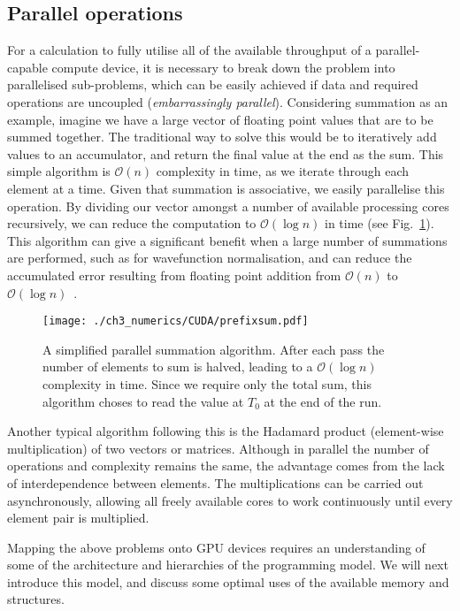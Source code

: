 \subsection{Parallel operations}\label{subsec:par_op}
\label{sub:Parallel operations}
For a calculation to fully utilise all of the available throughput of a parallel-capable compute device, it is necessary to break down the problem into parallelised sub-problems, which can be easily achieved if data and required operations are uncoupled (\textit{embarrassingly parallel}). Considering summation as an example, imagine we have a large vector of floating point values that are to be summed together. The traditional way to solve this would be to iteratively add values to an accumulator, and return the final value at the end as the sum. This simple algorithm is $\mathcal{O}(n)$ complexity in time, as we iterate through each element at a time. Given that summation is associative, we easily parallelise this operation. By dividing our vector amongst a number of available processing cores recursively, we can reduce the computation to $\mathcal{O}(\log{} n)$ in time (see Fig.~\ref{fig:prefixsum}). This algorithm can give a significant benefit when a large number of summations are performed, such as for wavefunction normalisation, and can reduce the accumulated error resulting from floating point addition from $\mathcal{O}(n)$ to $\mathcal{O}(\log{} n)$~\cite{NUM:Higham_siam_1993}.

\begin{figure}
    \centering
    \texttt{[image: ./ch3\_numerics/CUDA/prefixsum.pdf]}
    \caption{A simplified parallel summation algorithm. After each pass the number of elements to sum is halved, leading to a $\mathcal{O}(\log{} n)$ complexity in time. Since we require only the total sum, this algorithm choses to read the value at $T_0$ at the end of the run.}
    \label{fig:prefixsum}
\end{figure}

Another typical algorithm following this is the Hadamard product (element-wise multiplication) of two vectors or matrices. Although in parallel the number of operations and complexity remains the same, the advantage comes from the lack of interdependence between elements. The multiplications can be carried out asynchronously, allowing all freely available cores to work continuously until every element pair is multiplied.


Mapping the above problems onto GPU devices requires an understanding of some of the architecture and hierarchies of the programming model. We will next introduce this model, and discuss some optimal uses of the available memory and structures.


